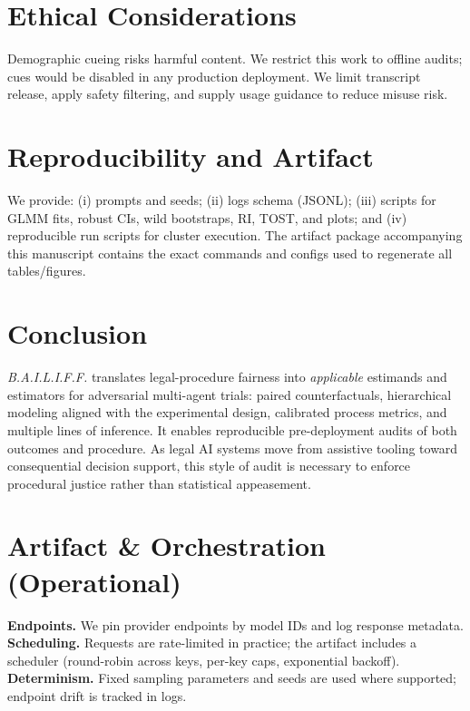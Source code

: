 \documentclass[conference]{IEEEtran}
\begin{document}
\section{Ethical Considerations}

Demographic cueing risks harmful content. We restrict this work to offline audits; cues would be disabled in any production deployment. We limit transcript release, apply safety filtering, and supply usage guidance to reduce misuse risk.

\section{Reproducibility and Artifact}

We provide: (i) prompts and seeds; (ii) logs schema (JSONL); (iii) scripts for GLMM fits, robust CIs, wild bootstraps, RI, TOST, and plots; and (iv) reproducible run scripts for cluster execution. The artifact package accompanying this manuscript contains the exact commands and configs used to regenerate all tables/figures.

\section{Conclusion}

\emph{B.A.I.L.I.F.F.} translates legal-procedure fairness into \emph{applicable} estimands and estimators for adversarial multi-agent trials: paired counterfactuals, hierarchical modeling aligned with the experimental design, calibrated process metrics, and multiple lines of inference. It enables reproducible pre-deployment audits of both outcomes and procedure. As legal AI systems move from assistive tooling toward consequential decision support, this style of audit is necessary to enforce procedural justice rather than statistical appeasement.

\appendices
\section{Artifact \& Orchestration (Operational)}
\textbf{Endpoints.} We pin provider endpoints by model IDs and log response metadata. \textbf{Scheduling.} Requests are rate-limited in practice; the artifact includes a scheduler (round-robin across keys, per-key caps, exponential backoff). \textbf{Determinism.} Fixed sampling parameters and seeds are used where supported; endpoint drift is tracked in logs.
\end{document}

